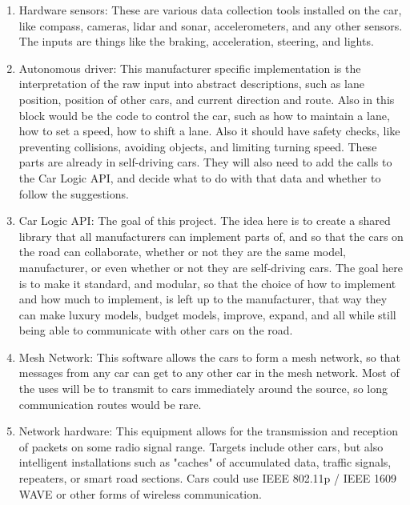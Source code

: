 \documentclass[11pt]{article}
\begin{document}
	\begin{enumerate}
		\item Hardware sensors: These are various data collection tools installed
			on the car, like compass, cameras, lidar and sonar, accelerometers,
			and any other sensors. The inputs are things like the braking,
			acceleration, steering, and lights.
		\item Autonomous driver: This manufacturer specific implementation
			is the interpretation of the raw input into abstract descriptions,
			such as lane position, position of other cars, and current direction
			and route. Also in this block would be the code to control the car,
			such as how to maintain a lane, how to set a speed, how to shift a lane.
			Also it should have safety checks, like preventing collisions, avoiding
			objects, and limiting turning speed. These parts are already in
			self-driving cars. They will also need to add the calls to the Car Logic API,
			and decide what to do with that data and whether to follow the suggestions.
		\item Car Logic API: The goal of this project. The idea here is to create a
			shared library that all manufacturers can implement parts of, and
			so that the cars on the road can collaborate, whether
			or not they are the same model, manufacturer, or even whether or not they
			are self-driving cars. The goal here is to make it standard, and modular, so that
			the choice of how to implement and how much to implement, is left up to
			the manufacturer, that way they can make luxury models, budget models,
			improve, expand, and all while still being able to communicate with other
			cars on the road.
		\item Mesh Network: This software allows the cars to form a mesh network, so that
			messages from any car can get to any other car in the mesh network. Most
			of the uses will be to transmit to cars immediately around the source, so
			long communication routes would be rare.
		\item Network hardware: This equipment allows for the transmission and
			reception of packets on some radio signal range. Targets include other
			cars, but also intelligent installations such as "caches" of accumulated
			data, traffic signals, repeaters, or smart road sections. Cars could use
			IEEE 802.11p / IEEE 1609 WAVE or other forms of wireless communication.
	\end{enumerate}
\end{document}
